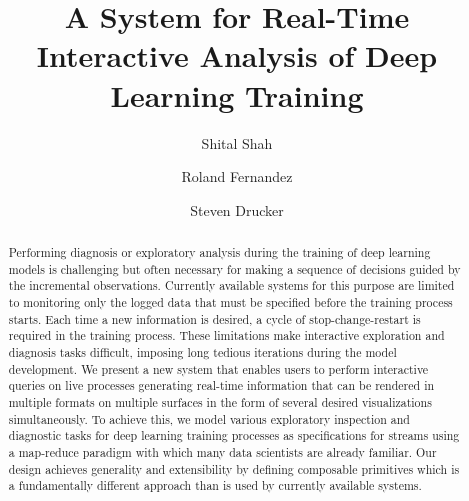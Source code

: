\documentclass[sigchi]{acmart} %
\begin{document}
%
\title{A System for Real-Time Interactive Analysis of Deep Learning Training}

%
\author{Shital Shah}

\author{Roland Fernandez}

\author{Steven Drucker}

%

%
\begin{abstract}
  Performing diagnosis or exploratory analysis during the training of deep learning models is challenging but often necessary for making a sequence of decisions guided by the incremental observations. Currently available systems for this purpose are limited to monitoring only the logged data that must be specified before the training process starts. Each time a new information is desired, a cycle of stop-change-restart is required in the training process. These limitations make interactive exploration and diagnosis tasks difficult, imposing long tedious iterations during the model development. We present a new system that enables users to perform interactive queries on live processes generating real-time information that can be rendered in multiple formats on multiple surfaces in the form of several desired visualizations simultaneously. To achieve this, we model various exploratory inspection and diagnostic tasks for deep learning training processes as specifications for streams using a map-reduce paradigm with which many data scientists are already familiar. Our design achieves generality and extensibility by defining composable primitives which is a fundamentally different approach than is used by currently available systems.
\end{abstract}
\end{document}

